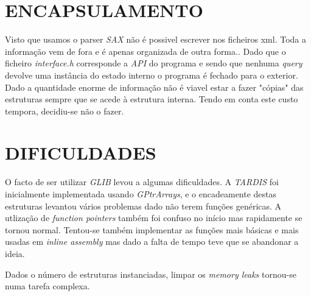 \documentclass[letterpaper, 10 pt, conference]{IEEEtran}  %
\begin{document}
\section{ENCAPSULAMENTO}

Visto que usamos o parser \textit{SAX} não é possivel escrever nos ficheiros xml. Toda a informação vem de fora e  é apenas organizada de outra forma.. Dado que o ficheiro \textit{interface.h} corresponde a \textit{API} do programa e sendo que nenhuma \textit{query} devolve uma instância do estado interno o programa é fechado para o exterior.
Dado a quantidade enorme de informação não é viavel estar a fazer "cópias" das estruturas sempre que se acede à estrutura interna. Tendo em conta este custo tempora, decidiu-se não o fazer.


\section{DIFICULDADES}

O facto de ser utilizar \textit{GLIB} levou a algumas dificuldades. A \textit{TARDIS} foi inicialmente implementada usando \textit{GPtrArrays}, e o encadeamente destas estruturas levantou vários problemas dado não terem funções genéricas.
A utlização de \textit{function pointers} também foi confuso no início mas rapidamente se tornou normal. Tentou-se também implementar as funções mais básicas e mais usadas em \textit{inline assembly} mas dado a falta de tempo teve que se abandonar a ideia.

Dados o número de estruturas instanciadas, limpar os \textit{memory leaks} tornou-se numa tarefa complexa.



\addtolength{\textheight}{-12cm}   %




\end{document}
